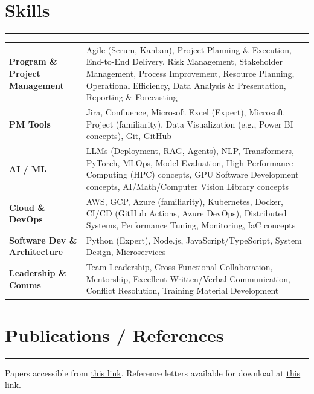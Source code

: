 \documentclass[10pt, a4paper]{article} %
\begin{document}
\section*{Skills}
\vspace{-4pt}\rule{\textwidth}{0.4pt}\vspace{2pt}
\small{
\begin{tabular}{@{} >{\bfseries}p{} p{} @{}} %
    Program \& Project Management & Agile (Scrum, Kanban), Project Planning \& Execution, End-to-End Delivery, Risk Management, Stakeholder Management, Process Improvement, Resource Planning, Operational Efficiency, Data Analysis \& Presentation, Reporting \& Forecasting \\
    PM Tools & Jira, Confluence, Microsoft Excel (Expert), Microsoft Project (familiarity), Data Visualization (e.g., Power BI concepts), Git, GitHub \\
    AI / ML & LLMs (Deployment, RAG, Agents), NLP, Transformers, PyTorch, MLOps, Model Evaluation, High-Performance Computing (HPC) concepts, GPU Software Development concepts, AI/Math/Computer Vision Library concepts \\
    Cloud \& DevOps & AWS, GCP, Azure (familiarity), Kubernetes, Docker, CI/CD (GitHub Actions, Azure DevOps), Distributed Systems, Performance Tuning, Monitoring, IaC concepts \\
    Software Dev \& Architecture & Python (Expert), Node.js, JavaScript/TypeScript, System Design, Microservices \\
    Leadership \& Comms & Team Leadership, Cross-Functional Collaboration, Mentorship, Excellent Written/Verbal Communication, Conflict Resolution, Training Material Development \\
\end{tabular}
}

\section*{Publications / References} %
\vspace{-4pt}\rule{\textwidth}{0.4pt}\vspace{4pt} %
\small{ %
Papers accessible from \href{https://scholar.google.com/citations?user=aVLwjvYAAAAJ}{\underline{this link}}. Reference letters available for download at \href{https://drive.google.com/drive/folders/17ZoqIKTMermg7flDVFVwqN4IesXFgBvo?usp=sharing}{\underline{this link}}.
}
\vspace{4pt}
\end{document}

